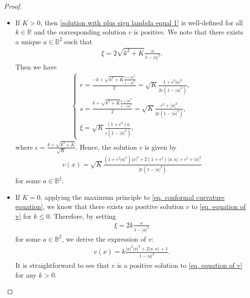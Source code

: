 \documentclass[11pt,a4paper,twoside]{amsart}
\newtheorem{sketch proof}{Sketch of the proof}[section]
\begin{document}
\begin{proof}
\begin{itemize}
\item If $K>0$, then  \cref{solution with plus sign lambda equal 1} is well-defined for all $k\in\mathbb{R}$ and the corresponding solution $v$ is positive. We note that there exists a unique $a\in\mathbb{B}^2$ such that
\begin{align*}
    \xi=2\sqrt{k^2+K}\frac{a}{1-|a|^2}.
\end{align*}
Then we have
\begin{align*}
\begin{cases}
    r=\frac{-k+\sqrt{k^2+K}\frac{1+|a|^2}{1-|a|^2}}{2}
    =\sqrt{K}\frac{1+\epsilon^2 |a|^2}{2\epsilon(1-|a|^2)},\\[2mm]
    s=\frac{k+\sqrt{k^2+K}\frac{1+|a|^2}{1-|a|^2}}{2}
    =\sqrt{K}\frac{\epsilon^2+ |a|^2}{2\epsilon(1-|a|^2)},\\[2mm]
    \xi=\sqrt{K}\frac{(1+\epsilon^2)a}{\epsilon(1-|a|^2)},
\end{cases}
\end{align*}
where $\epsilon=\frac{k+\sqrt{k^2+K}}{\sqrt{K}}$.
Hence, the solution $v$ is given by
\begin{align*}
    v(x)=\sqrt{K}
    \frac{(1+\epsilon^2|a|^2)|x|^2
    +2(1+\epsilon^2)\langle x,a\rangle
    +\epsilon^2+|a|^2}{2\epsilon(1-|a|^2)}
\end{align*}
for some $a\in\mathbb{B}^2$.


    \item If $K=0$, applying the maximum principle to \cref{eq. conformal curvature equation}, we know that there exists no positive solution $v$ to \cref{eq. equation of v} for $k\leq 0$.  Therefore, by setting 
\begin{align*}
    \xi=2k\frac{a}{1-|a|^2}
\end{align*}
for some $a\in\mathbb{B}^2$, we derive the expression of $v$:
\begin{align*}
    v(x)=k\frac{|a|^2|x|^2+2\langle x,a\rangle+1}{1-|a|^2}.
\end{align*}
It is straightforward to see that $v$ is a positive solution to \cref{eq. equation of v} for any $k>0$.


\end{itemize}
\end{proof}
\end{document}
